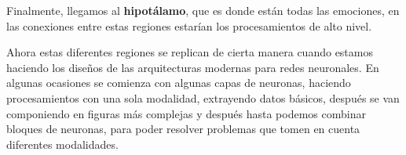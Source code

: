 Finalmente, llegamos al \textbf{hipotálamo}, que es donde están todas las emociones, en las conexiones entre estas regiones estarían los procesamientos de alto nivel.


Ahora estas diferentes regiones se replican de cierta manera cuando estamos haciendo los diseños de las arquitecturas modernas para redes neuronales.
En algunas ocasiones se comienza con algunas capas de neuronas, haciendo procesamientos con una sola modalidad, extrayendo datos básicos, después se van
componiendo en figuras más complejas y después hasta podemos combinar bloques de neuronas, para poder resolver problemas que tomen en cuenta diferentes modalidades.






